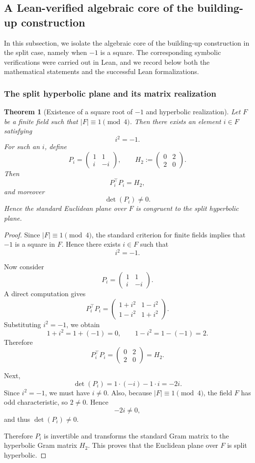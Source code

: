 \documentclass[12pt]{article}
\newtheorem{theorem}{Theorem}[section]
\begin{document}
\subsection{A Lean-verified algebraic core of the building-up construction}

In this subsection, we isolate the algebraic core of the building-up construction in the split case, namely when $-1$ is a square. The corresponding symbolic verifications were carried out in Lean, and we record below both the mathematical statements and the successful Lean formalizations.

\subsubsection{The split hyperbolic plane and its matrix realization}

\begin{theorem}[Existence of a square root of $-1$ and hyperbolic realization]
\label{thm:hyperbolic-realization}
Let $F$ be a finite field such that $|F| \equiv 1 \pmod 4$. Then there exists an element $i \in F$ satisfying
\[
i^2 = -1.
\]
For such an $i$, define
\[
P_i =
\begin{pmatrix}
1 & 1\\
i & -i
\end{pmatrix},
\qquad
H_2 :=
\begin{pmatrix}
0 & 2\\
2 & 0
\end{pmatrix}.
\]
Then
\[
P_i^{\top} P_i = H_2,
\]
and moreover
\[
\det(P_i) \neq 0.
\]
Hence the standard Euclidean plane over $F$ is congruent to the split hyperbolic plane.
\end{theorem}

\begin{proof}
Since $|F| \equiv 1 \pmod 4$, the standard criterion for finite fields implies that $-1$ is a square in $F$. Hence there exists $i \in F$ such that
\[
i^2 = -1.
\]

Now consider
\[
P_i =
\begin{pmatrix}
1 & 1\\
i & -i
\end{pmatrix}.
\]
A direct computation gives
\[
P_i^{\top} P_i
=
\begin{pmatrix}
1+i^2 & 1-i^2\\
1-i^2 & 1+i^2
\end{pmatrix}.
\]
Substituting $i^2=-1$, we obtain
\[
1+i^2 = 1+(-1)=0,
\qquad
1-i^2 = 1-(-1)=2.
\]
Therefore
\[
P_i^{\top} P_i
=
\begin{pmatrix}
0 & 2\\
2 & 0
\end{pmatrix}
= H_2.
\]

Next,
\[
\det(P_i) = 1\cdot(-i)-1\cdot i = -2i.
\]
Since $i^2=-1$, we must have $i\neq 0$. Also, because $|F|\equiv 1 \pmod 4$, the field $F$ has odd characteristic, so $2\neq 0$. Hence
\[
-2i \neq 0,
\]
and thus $\det(P_i)\neq 0$.

Therefore $P_i$ is invertible and transforms the standard Gram matrix to the hyperbolic Gram matrix $H_2$. This proves that the Euclidean plane over $F$ is split hyperbolic.
\end{proof}
\end{document}
